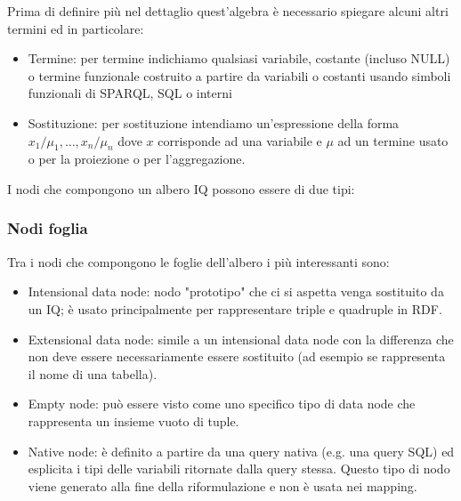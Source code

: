 Prima di definire più nel dettaglio quest'algebra è necessario spiegare alcuni altri termini ed in particolare:
\begin{itemize}
    \item Termine: per termine indichiamo qualsiasi variabile, costante (incluso NULL) o termine funzionale costruito a partire da variabili o costanti usando simboli funzionali di SPARQL, SQL o interni
    \item Sostituzione: per sostituzione intendiamo un'espressione della forma \linebreak
        $x_1/\mu_1 , \dots , x_n/\mu_n $ dove $x$ corrisponde ad una variabile e $\mu$ ad un termine usato o per la proiezione o per l'aggregazione.
\end{itemize} 
\noindent
I nodi che compongono un albero IQ possono essere di due tipi: \cite{IQ}
\subsubsection*{Nodi foglia} 
Tra i nodi che compongono le foglie dell'albero i più interessanti sono:
    \begin{itemize}
        \item Intensional data node: nodo "prototipo" che ci si aspetta venga sostituito da un IQ; è usato principalmente per rappresentare triple e quadruple in RDF.
        \item Extensional data node: simile a un intensional data node con la differenza che non deve essere necessariamente essere sostituito (ad esempio se rappresenta il nome di una tabella).
        \item Empty node: può essere visto come uno specifico tipo di data node che rappresenta un insieme vuoto di tuple.
        \item Native node: è definito a partire da una query nativa (e.g. una query SQL) ed esplicita i tipi delle variabili ritornate dalla query stessa. Questo tipo di nodo viene generato alla fine 
            della riformulazione e non è usata nei mapping.
    \end{itemize}
